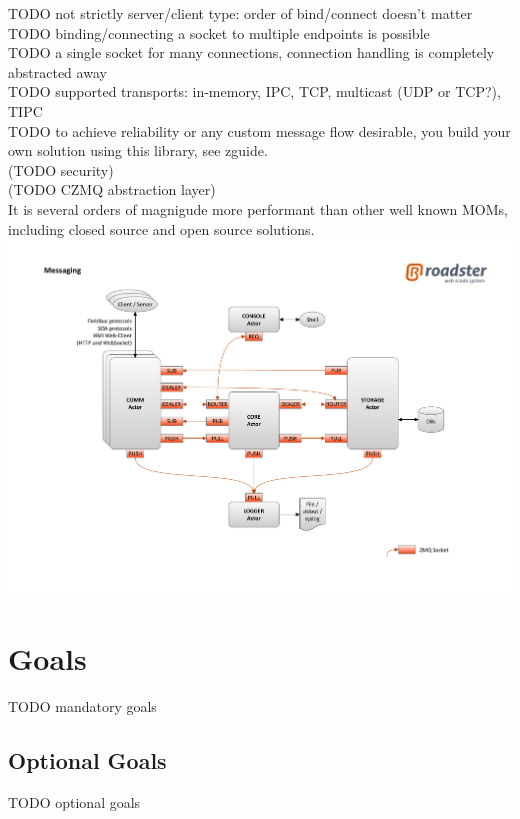 TODO not strictly server/client type: order of bind/connect doesn't matter\\
TODO binding/connecting a socket to multiple endpoints is possible\\
TODO a single socket for many connections, connection handling is completely abstracted away\\
TODO supported transports: in-memory, IPC, TCP, multicast (UDP or TCP?), TIPC\\
TODO to achieve reliability or any custom message flow desirable, you build your own solution using this library, see zguide.\\
(TODO security)\\
(TODO CZMQ abstraction layer)\\

It is several orders of magnigude more performant than other well known MOMs,
including closed source and open source solutions.\\

\includegraphics[trim=4cm 2cm 3.5cm 2.8cm, clip=true, width=\textwidth]{img/roadster_arch.pdf}

\section{Goals}
TODO mandatory goals

\subsection*{Optional Goals}
TODO optional goals
